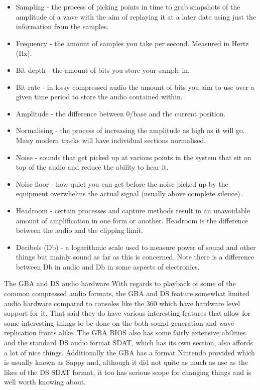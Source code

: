 \documentclass[
]{book}
\providecommand{\tightlist}{%
  \setlength{\itemsep}{0pt}\setlength{\parskip}{0pt}}
\begin{document}
\begin{itemize}
\tightlist
\item
  Sampling - the process of picking points in time to grab snapshots of the amplitude of a wave with the aim of replaying it at a later date using just the information from the samples.
\item
  Frequency - the amount of samples you take per second. Measured in Hertz (Hz).
\item
  Bit depth - the amount of bits you store your sample in.
\item
  Bit rate - in lossy compressed audio the amount of bits you aim to use over a given time period to store the audio contained within.
\item
  Amplitude - the difference between 0/base and the current position.
\item
  Normalising - the process of increasing the amplitude as high as it will go. Many modern tracks will have individual sections normalised.
\item
  Noise - sounds that get picked up at various points in the system that sit on top of the audio and reduce the ability to hear it.
\item
  Noise floor - how quiet you can get before the noise picked up by the equipment overwhelms the actual signal (usually above complete silence).
\item
  Headroom - certain processes and capture methods result in an unavoidable amount of amplification in one form or another. Headroom is the difference between the audio and the clipping limit.
\item
  Decibels (Db) - a logarithmic scale used to measure power of sound and other things but mainly sound as far as this is concerned. Note there is a difference between Db in audio and Db in some aspects of electronics.
\end{itemize}

The GBA and DS audio hardware With regards to playback of some of the common compressed audio formats, the GBA and DS feature somewhat limited audio hardware compared to consoles like the 360 which have hardware level support for it. That said they do have various interesting features that allow for some interesting things to be done on the both sound generation and wave replication fronts alike. The GBA BIOS also has some fairly extensive abilities and the standard DS audio format SDAT, which has its own section, also affords a lot of nice things. Additionally the GBA has a format Nintendo provided which is usually known as Sappy and, although it did not quite as much as use as the likes of the DS SDAT format, it too has serious scope for changing things and is well worth knowing about.
\end{document}
